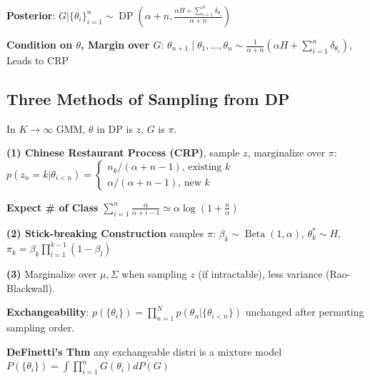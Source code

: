 \textbf{Posterior}: $G | \{\theta_{i}\}_{i=1}^n \sim \operatorname{DP}\left(\alpha+n, \frac{\alpha H + \sum_{i=1}^{n} \delta_{\theta_{i}}}{\alpha+n}\right)$

\textbf{Condition on $\theta$, Margin over $G$}: $\theta_{n+1} \mid \theta_{1}, \ldots, \theta_{n} \sim \frac{1}{\alpha+n}\left(\alpha H+\sum_{i=1}^{n} \delta_{\theta_{i}}\right)$, Leads to CRP

\subsection*{Three Methods of Sampling from DP}

In $K\to\infty$ GMM, $\theta$ in DP is $z$, $G$ is $\pi$. 

\textbf{(1) Chinese Restaurant Process (CRP)}, sample $z$, marginalize over $\pi$: \\
$p(z_n = k| \theta_{i < n}) = 
\begin{cases}
    n_k / (\alpha + n - 1) \text{, existing }k \\
    \alpha / (\alpha + n - 1) \text{, new }k 
\end{cases}
$

\textbf{Expect \# of Class} $\sum_{i=1}^{n} \frac{\alpha}{\alpha+i-1} \simeq \alpha \log \left(1+\frac{n}{\alpha}\right)$

\textbf{(2) Stick-breaking Construction} samples $\pi$: $\beta_{k} \sim \operatorname{Beta}(1, \alpha)$, $\theta_{k}^{*} \sim H$, $\pi_{k}=\beta_{k} \prod_{l=1}^{k-1}\left(1-\beta_{l}\right)$

\textbf{(3)} Marginalize over $\mu, \Sigma$ when sampling $z$ (if intractable), less variance (Rao-Blackwall).

\textbf{Exchangeability}: $p(\{\theta_i\}) = \prod_{n=1}^N p(\theta_n | \{\theta_{i<n}\})$ unchanged after permuting sampling order.

\textbf{DeFinetti’s Thm} any exchangeable distri is a mixture model $P\left(\{\theta_{i}\}\right)=\int \prod_{i=1}^{n} G\left(\theta_{i}\right) d P(G)$
